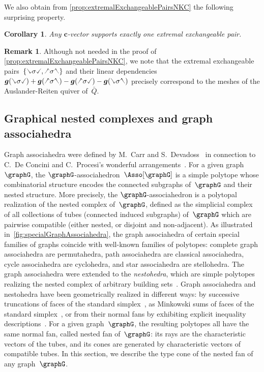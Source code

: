 \documentclass{amsart}
\newtheorem{corollary}[theorem]{Corollary}
\theoremstyle{definition}
\newtheorem{remark}[theorem]{Remark}
\renewcommand{\b}[1]{{\boldsymbol{#1}}} %
\newcommand{\darkblue}{\color{darkblue}} %
\newcommand{\defn}[1]{\textsl{\darkblue #1}} %
\newcommand{\gvector}[1]{\b{g}(#1)} %
\newcommand{\quiver}{\bar Q} %
\newcommand{\hL}{\text{\rotatebox[origin=c]{180}{\checked}}}
\newcommand{\hR}{\text{\rotatebox[origin=c]{180}{\reflectbox{\checked}}}}
\newcommand{\cL}{\text{\reflectbox{\checked}}}
\newcommand{\cR}{\text{\checked}}
\newcommand{\hh}[1]{\hL#1\hR} %
\newcommand{\cc}[1]{\cL#1\cR} %
\newcommand{\hc}[1]{\hL#1\cR} %
\newcommand{\ch}[1]{\cL#1\hR} %
\begin{document}
We also obtain from \cref{prop:extremalExchangeablePairsNKC} the following surprising property.

\begin{corollary}
Any $\b{c}$-vector supports exactly one extremal exchangeable pair.
\end{corollary}

\begin{remark}
\label{rem:meshARquiver}
Although not needed in the proof of \cref{prop:extremalExchangeablePairsNKC}, we note that the extremal exchangeable pairs~$\{\cc{\sigma}, \hh{\sigma}\}$ and their linear dependencies~${\gvector{\cc{\sigma}} + \gvector{\hh{\sigma}} - \gvector{\hc{\sigma}} - \gvector{\ch{\sigma}}}$ precisely correspond to the meshes of the Auslander-Reiten quiver of~$\quiver$.
\end{remark}


\subsection{Graphical nested complexes and graph associahedra}

Graph associahedra were defined by M.~Carr and S.~Devadoss~\cite{CarrDevadoss} in connection to C.~De Concini and C.~Procesi's wonderful arrangements~\cite{DeConciniProcesi}.
For a given graph~$\graphG$, the $\graphG$-associahedron~$\Asso[\graphG]$ is a simple polytope whose combinatorial structure encodes the connected subgraphs of~$\graphG$ and their nested structure.
More precisely, the $\graphG$-associahedron is a polytopal realization of the nested complex of~$\graphG$, defined as the simplicial complex of all collections of tubes (connected induced subgraphs) of~$\graphG$ which are pairwise compatible (either nested, or disjoint and non-adjacent).
As illustrated in~\cref{fig:specialGraphAssociahedra}, the graph associahedra of certain special families of graphs coincide with well-known families of polytopes: complete graph associahedra are permutahedra, path associahedra are classical associahedra, cycle associahedra are cyclohedra, and star associahedra are stellohedra.
The graph associahedra were extended to the \defn{nestohedra}, which are simple polytopes realizing the nested complex of arbitrary building sets~\cite{Postnikov, FeichtnerSturmfels}.
Graph associahedra and nestohedra have been geometrically realized in different ways: by successive truncations of faces of the standard simplex~\cite{CarrDevadoss}, as Minkowski sums of faces of the standard simplex~\cite{Postnikov, FeichtnerSturmfels}, or from their normal fans by exhibiting explicit inequality descriptions~\cite{Devadoss, Zelevinsky}.
For a given graph~$\graphG$, the resulting polytopes all have the same normal fan, called nested fan of~$\graphG$: its rays are the characteristic vectors of the tubes, and its cones are generated by characteristic vectors of compatible tubes.
In this section, we describe the type cone of the nested fan of any graph~$\graphG$.
\end{document}
